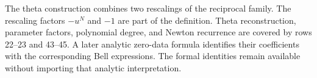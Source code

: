 The theta construction combines two rescalings of the reciprocal family.
The rescaling factors $-u^N$ and $-1$ are part of the definition. Theta reconstruction, parameter factors, polynomial degree, and Newton recurrence are covered by rows 22--23 and 43--45. A later analytic zero-data formula identifies their coefficients with the corresponding Bell expressions. The formal identities remain available without importing that analytic interpretation.
